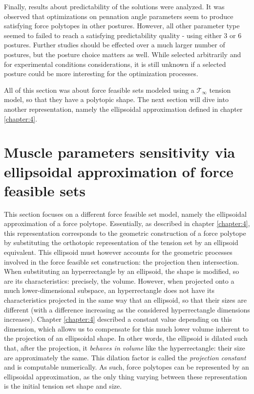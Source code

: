 Finally, results about predictability of the solutions were analyzed. It was observed that optimizations on pennation angle parameters seem to produce satisfying force polytopes in other postures. However, all other parameter type seemed to failed to reach a satisfying predictability quality - using either 3 or 6 postures. Further studies should be effected over a much larger number of postures, but the posture choice matters as well. While selected arbitrarily and for experimental conditions considerations, it is still unknown if a selected posture could be more interesting for the optimization processes.

All of this section was about force feasible sets modeled using a $\mathcal{T}_{\infty}$ tension model, so that they have a polytopic shape. The next section will dive into another representation, namely the ellipsoidal approximation defined in chapter \ref{chapter:4}.


\clearpage
\section{Muscle parameters sensitivity via ellipsoidal approximation of force feasible sets}
\label{sec:personalization_silico_ellipsoid}

This section focuses on a different force feasible set model, namely the ellipsoidal approximation of a force polytope. Essentially, as described in chapter \ref{chapter:4}, this representation corresponds to the geometric construction of a force polytope by substituting the orthotopic representation of the tension set by an ellipsoid equivalent. This ellipsoid must however accounts for the geometric processes involved in the force feasible set construction: the projection then intersection. When substituting an hyperrectangle by an ellipsoid, the shape is modified, so are its characteristics: precisely, the volume. However, when projected onto a much lower-dimensional subspace, an hyperrectangle does not have its characteristics projected in the same way that an ellipsoid, so that their sizes are different (with a difference increasing as the considered hyperrectangle dimensions increases). Chapter \ref{chapter:4} described a constant value depending on this dimension, which allows us to compensate for this much lower volume inherent to the projection of an ellipsoidal shape. In other words, the ellipsoid is dilated such that, after the projection, it \emph{behaves in volume} like the hyperrectangle: their size are approximately the same. This dilation factor is called the \emph{projection constant} and is computable numerically. As such, force polytopes can be represented by an ellipsoidal approximation, as the only thing varying between these representation is the initial tension set shape and size.

